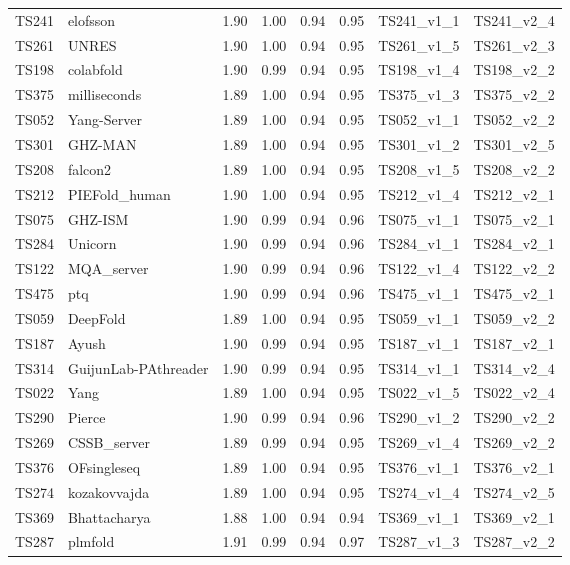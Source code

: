 \begin{longtable}{llllllll}
TS241 & elofsson & 1.90 & 1.00 & 0.94 & 0.95 & TS241\_v1\_1 & TS241\_v2\_4 \\ 
TS261 & UNRES & 1.90 & 1.00 & 0.94 & 0.95 & TS261\_v1\_5 & TS261\_v2\_3 \\ 
TS198 & colabfold & 1.90 & 0.99 & 0.94 & 0.95 & TS198\_v1\_4 & TS198\_v2\_2 \\ 
TS375 & milliseconds & 1.89 & 1.00 & 0.94 & 0.95 & TS375\_v1\_3 & TS375\_v2\_2 \\ 
TS052 & Yang-Server & 1.89 & 1.00 & 0.94 & 0.95 & TS052\_v1\_1 & TS052\_v2\_2 \\ 
TS301 & GHZ-MAN & 1.89 & 1.00 & 0.94 & 0.95 & TS301\_v1\_2 & TS301\_v2\_5 \\ 
TS208 & falcon2 & 1.89 & 1.00 & 0.94 & 0.95 & TS208\_v1\_5 & TS208\_v2\_2 \\ 
TS212 & PIEFold\_human & 1.90 & 1.00 & 0.94 & 0.95 & TS212\_v1\_4 & TS212\_v2\_1 \\ 
TS075 & GHZ-ISM & 1.90 & 0.99 & 0.94 & 0.96 & TS075\_v1\_1 & TS075\_v2\_1 \\ 
TS284 & Unicorn & 1.90 & 0.99 & 0.94 & 0.96 & TS284\_v1\_1 & TS284\_v2\_1 \\ 
TS122 & MQA\_server & 1.90 & 0.99 & 0.94 & 0.96 & TS122\_v1\_4 & TS122\_v2\_2 \\ 
TS475 & ptq & 1.90 & 0.99 & 0.94 & 0.96 & TS475\_v1\_1 & TS475\_v2\_1 \\ 
TS059 & DeepFold & 1.89 & 1.00 & 0.94 & 0.95 & TS059\_v1\_1 & TS059\_v2\_2 \\ 
TS187 & Ayush & 1.90 & 0.99 & 0.94 & 0.95 & TS187\_v1\_1 & TS187\_v2\_1 \\ 
TS314 & GuijunLab-PAthreader & 1.90 & 0.99 & 0.94 & 0.95 & TS314\_v1\_1 & TS314\_v2\_4 \\ 
TS022 & Yang & 1.89 & 1.00 & 0.94 & 0.95 & TS022\_v1\_5 & TS022\_v2\_4 \\ 
TS290 & Pierce & 1.90 & 0.99 & 0.94 & 0.96 & TS290\_v1\_2 & TS290\_v2\_2 \\ 
TS269 & CSSB\_server & 1.89 & 0.99 & 0.94 & 0.95 & TS269\_v1\_4 & TS269\_v2\_2 \\ 
TS376 & OFsingleseq & 1.89 & 1.00 & 0.94 & 0.95 & TS376\_v1\_1 & TS376\_v2\_1 \\ 
TS274 & kozakovvajda & 1.89 & 1.00 & 0.94 & 0.95 & TS274\_v1\_4 & TS274\_v2\_5 \\ 
TS369 & Bhattacharya & 1.88 & 1.00 & 0.94 & 0.94 & TS369\_v1\_1 & TS369\_v2\_1 \\ 
TS287 & plmfold & 1.91 & 0.99 & 0.94 & 0.97 & TS287\_v1\_3 & TS287\_v2\_2 \\ 

\end{longtable}
